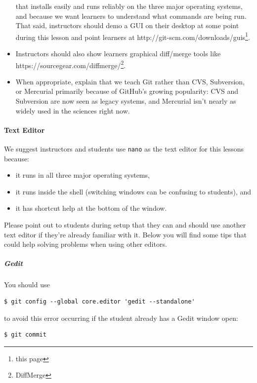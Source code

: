 \documentclass[]{book}
\newcommand{\urlfoot}[2]{{#1}\footnote{#2}}
\begin{document}
\begin{itemize}
  that installs easily and runs reliably on the three major operating
  systems, and because we want learners to understand what commands are
  being run. That said, instructors should demo a GUI on their desktop
  at some point during this lesson and point learners at
  \urlfoot{http://git-scm.com/downloads/guis}{this page}.
\item
  Instructors should also show learners graphical diff/merge tools like
  \urlfoot{https://sourcegear.com/diffmerge/}{DiffMerge}.
\item
  When appropriate, explain that we teach Git rather than CVS,
  Subversion, or Mercurial primarily because of GitHub's growing
  popularity: CVS and Subversion are now seen as legacy systems, and
  Mercurial isn't nearly as widely used in the sciences right now.
\end{itemize}

\mbox{}\paragraph{Text Editor}

We suggest instructors and students use \texttt{nano} as the text editor
for this lessons because:

\begin{itemize}
\item
  it runs in all three major operating systems,
\item
  it runs inside the shell (switching windows can be confusing to
  students), and
\item
  it has shortcut help at the bottom of the window.
\end{itemize}

Please point out to students during setup that they can and should use
another text editor if they're already familiar with it. Below you will
find some tips that could help solving problems when using other
editors.

\subparagraph{Gedit}

You should use

\begin{verbatim}
$ git config --global core.editor 'gedit --standalone'
\end{verbatim}

to avoid this error occurring if the student already has a Gedit window
open:

\begin{verbatim}
$ git commit
\end{verbatim}
\end{document}
